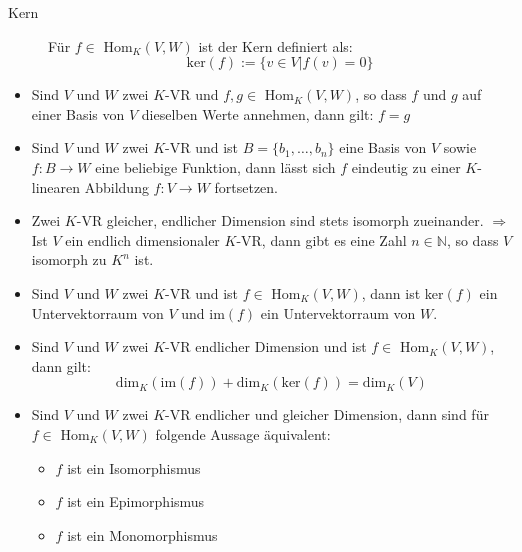 \begin{description}
	\item [Kern] Für $f \in $ Hom$_K(V, W)$ ist der Kern definiert als:
	\begin{equation*}
		\mbox{ker}(f) := \{v \in V | f(v) = 0\}
	\end{equation*}
\end{description}
\begin{itemize}\itemsep0em
	\item Sind $V$ und $W$ zwei $K$-VR und $f, g \in $ Hom$_K(V, W)$, so dass $f$ und $g$ auf einer Basis von $V$ dieselben Werte annehmen, dann gilt: $f = g$
	\item Sind $V$ und $W$ zwei $K$-VR und ist $B = \{b_1, \dots, b_n\}$ eine Basis von $V$ sowie $f: B \rightarrow W$ eine beliebige Funktion, dann lässt sich $f$ eindeutig zu einer $K$-linearen Abbildung $f: V \rightarrow W$ fortsetzen.
	\item Zwei $K$-VR gleicher, endlicher Dimension sind stets isomorph zueinander. $\Rightarrow$ Ist $V$ ein endlich dimensionaler $K$-VR, dann gibt es eine Zahl $n \in \mathbb{N}$, so dass $V$ isomorph zu $K^n$ ist.
	\item Sind $V$ und $W$ zwei $K$-VR und ist $f \in$ Hom$_K(V, W)$, dann ist ker$(f)$ ein Untervektorraum von $V$ und im$(f)$ ein Untervektorraum von $W$.
	\item Sind $V$ und $W$ zwei $K$-VR endlicher Dimension und ist $f \in$ Hom$_K(V, W)$, dann gilt:
	\begin{equation}
		\mbox{dim}_K(\mbox{im}(f)) + \mbox{dim}_K(\mbox{ker}(f)) = \mbox{dim}_K(V)
	\end{equation}
	\item Sind $V$ und $W$ zwei $K$-VR endlicher und gleicher Dimension, dann sind für $f \in$ Hom$_K(V, W)$ folgende Aussage äquivalent:
	\begin{itemize}
		\item $f$ ist ein Isomorphismus
		\item $f$ ist ein Epimorphismus
		\item $f$ ist ein Monomorphismus
	\end{itemize}
\end{itemize}



